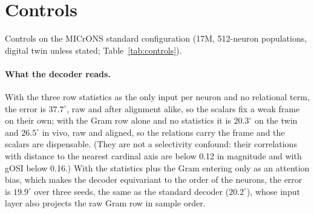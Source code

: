 \documentclass[11pt]{article}
\begin{document}
\section{Controls}
\label{app:controls}
Controls on the MICrONS standard configuration (17M, 512-neuron populations, digital twin unless stated; Table~\ref{tab:controls}).

\paragraph{What the decoder reads.} With the three row statistics as the only input per neuron and no relational term, the error is $37.7^\circ$, raw and after alignment alike, so the scalars fix a weak frame on their own; with the Gram row alone and no statistics it is $20.3^\circ$ on the twin and $26.5^\circ$ in vivo, raw and aligned, so the relations carry the frame and the scalars are dispensable. (They are not a selectivity confound: their correlations with distance to the nearest cardinal axis are below 0.12 in magnitude and with gOSI below 0.16.) With the statistics plus the Gram entering only as an attention bias, which makes the decoder equivariant to the order of the neurons, the error is $19.9^\circ$ over three seeds, the same as the standard decoder ($20.2^\circ$), whose input layer also projects the raw Gram row in sample order.
\end{document}
